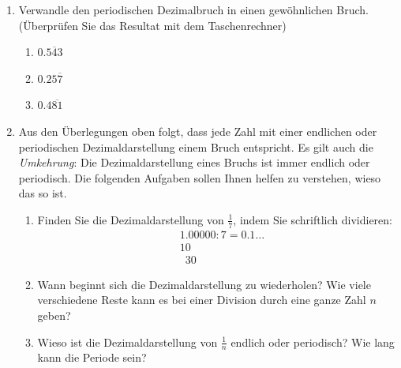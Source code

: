 \clearpage

\begin{ueb}
    {}{}
    \begin{enumerate}
        \item  Verwandle den periodischen Dezimalbruch in einen gewöhnlichen Bruch. (Überprüfen Sie das Resultat mit dem Taschenrechner)

        \begin{enumerate}
            \item \( 0.\overline{543} \)
            \item \( 0.25\overline{7} \)
            \item \( 0.4\overline{81} \)
        \end{enumerate}
        
        \item Aus den Überlegungen oben folgt, dass jede Zahl mit einer endlichen oder periodischen Dezimaldarstellung einem Bruch entspricht. Es gilt auch die \emph{Umkehrung}: Die Dezimaldarstellung eines Bruchs ist immer endlich oder periodisch. Die folgenden Aufgaben sollen Ihnen helfen zu verstehen, wieso das so ist.
        \begin{enumerate}
            \item Finden Sie die Dezimaldarstellung von $\frac{1}{7}$, indem Sie schriftlich dividieren:
            \begin{align*}
                &1.00000 : 7 = 0.1\ldots \\
                &10 \\
                &\phantom{1}30
            \end{align*}
            \item 	Wann beginnt sich die Dezimaldarstellung zu wiederholen? Wie viele verschiedene Reste kann es bei einer Division durch eine ganze Zahl $n$ geben?
            \item 	Wieso ist die Dezimaldarstellung von $\frac{1}{n}$ endlich oder periodisch? Wie lang kann die Periode sein?
        \end{enumerate}
        
    \end{enumerate}
\end{ueb}

